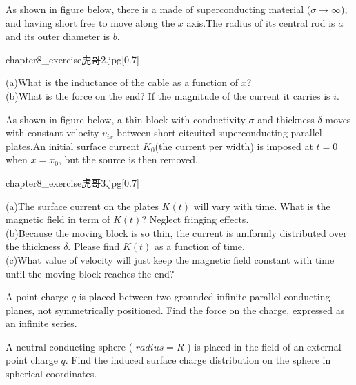 \begin{example}
    As shown in figure below, there is a  made of superconducting material (\(\sigma\rightarrow\infty\)),
    and having short  free to move along the $x$ axis.The radius of its central rod is \( a \) and its outer diameter is \( b \).
    \begin{singlefigure}{chapter8_exercise虎哥2.jpg}[0.7]
    \end{singlefigure}

    (a)What is the inductance of the cable as a function of $x$?\\
    (b)What is the force on the end? If the magnitude of the current it carries is \( i \).
\end{example}

\begin{example}
    As shown in figure below, a thin block with conductivity \(\sigma\) and thickness \( \delta \) moves with constant velocity $v_{ix}$
    between short citcuited superconducting parallel plates.An initial surface current \( K_0 \)(the current per width) is imposed
    at \( t = 0 \) when \( x = x_0 \), but the source is then removed.
    \begin{singlefigure}{chapter8_exercise虎哥3.jpg}[0.7]
    \end{singlefigure}

    (a)The surface current on the plates \( K(t) \) will vary with time. What is the magnetic field in term of \( K(t) \)? Neglect 
    fringing effects.\\
    (b)Because the moving block is so thin, the current is uniformly distributed over the thickness \( \delta \).
    Please find \( K(t) \) as a function of time.\\
    (c)What value of velocity will just keep the magnetic field constant with time until the moving block reaches the end?
\end{example}

\begin{example}
    A point charge \(q\) is placed between two grounded infinite parallel conducting planes, not symmetrically positioned. Find the force on the charge, expressed as an infinite series.
\end{example}

\begin{example}
    A neutral conducting sphere ( \(radius = R\) ) is placed in the field of an external point charge \(q\). Find the induced surface charge distribution on the sphere in spherical coordinates.
\end{example}

